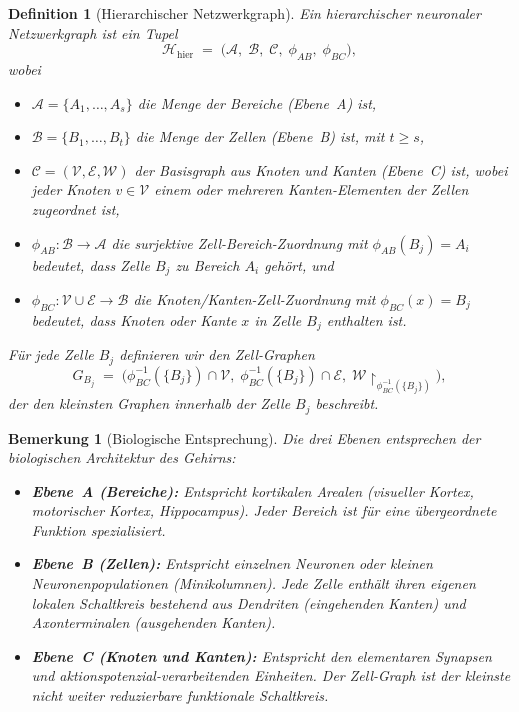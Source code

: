 ﻿\documentclass[12pt, a4paper, openany]{report}
\newtheorem{definition}[theorem]{Definition}
\newtheorem{remark}[theorem]{Bemerkung}
\newcommand{\calH}{\mathcal{H}}
\newcommand{\calV}{\mathcal{V}}
\newcommand{\calE}{\mathcal{E}}
\newcommand{\calW}{\mathcal{W}}
\newcommand{\calA}{\mathcal{A}}
\newcommand{\calB}{\mathcal{B}}
\newcommand{\calC}{\mathcal{C}}
\begin{document}
\begin{definition}[Hierarchischer Netzwerkgraph]
\label{def:hierarchical_graph}
Ein \emph{hierarchischer neuronaler Netzwerkgraph} ist ein Tupel
\[
  \calH_{\mathrm{hier}}
  \;=\;
  \bigl(\calA,\; \calB,\; \calC,\;
        \phi_{AB},\; \phi_{BC}\bigr),
\]
wobei
\begin{itemize}
  \item $\calA = \{A_1, \ldots, A_s\}$ die Menge der \emph{Bereiche}
    (Ebene~A) ist,
  \item $\calB = \{B_1, \ldots, B_t\}$ die Menge der \emph{Zellen}
    (Ebene~B) ist, mit $t \geq s$,
  \item $\calC = (\calV, \calE, \calW)$ der \emph{Basisgraph} aus Knoten
    und Kanten (Ebene~C) ist, wobei jeder Knoten $v \in \calV$ einem
    oder mehreren Kanten-Elementen der Zellen zugeordnet ist,
  \item $\phi_{AB} : \calB \to \calA$ die surjektive \emph{Zell-Bereich-Zuordnung}
    mit $\phi_{AB}(B_j) = A_i$ bedeutet, dass Zelle $B_j$ zu Bereich $A_i$
    gehört, und
  \item $\phi_{BC} : \calV \cup \calE \to \calB$ die \emph{Knoten/Kanten-Zell-Zuordnung}
    mit $\phi_{BC}(x) = B_j$ bedeutet, dass Knoten oder Kante $x$ in Zelle $B_j$
    enthalten ist.
\end{itemize}
Für jede Zelle $B_j$ definieren wir den \emph{Zell-Graphen}
\[
  G_{B_j}
  \;=\;
  \bigl(
    \phi_{BC}^{-1}(\{B_j\}) \cap \calV,\;
    \phi_{BC}^{-1}(\{B_j\}) \cap \calE,\;
    \calW\!\restriction_{\phi_{BC}^{-1}(\{B_j\})}
  \bigr),
\]
der den \emph{kleinsten Graphen} innerhalb der Zelle $B_j$ beschreibt.
\end{definition}

\begin{remark}[Biologische Entsprechung]
Die drei Ebenen entsprechen der biologischen Architektur des Gehirns:
\begin{itemize}
  \item \textbf{Ebene~A (Bereiche):} Entspricht kortikalen Arealen
    (visueller Kortex, motorischer Kortex, Hippocampus).  Jeder Bereich ist
    für eine übergeordnete Funktion spezialisiert.
  \item \textbf{Ebene~B (Zellen):} Entspricht einzelnen Neuronen oder kleinen
    Neuronenpopulationen (Minikolumnen).  Jede Zelle enthält ihren eigenen
    lokalen Schaltkreis bestehend aus Dendriten (eingehenden Kanten) und
    Axonterminalen (ausgehenden Kanten).
  \item \textbf{Ebene~C (Knoten und Kanten):} Entspricht den elementaren
    Synapsen und aktionspotenzial-verarbeitenden Einheiten.  Der Zell-Graph
    ist der kleinste nicht weiter reduzierbare funktionale Schaltkreis.
\end{itemize}
\end{remark}
\end{document}
